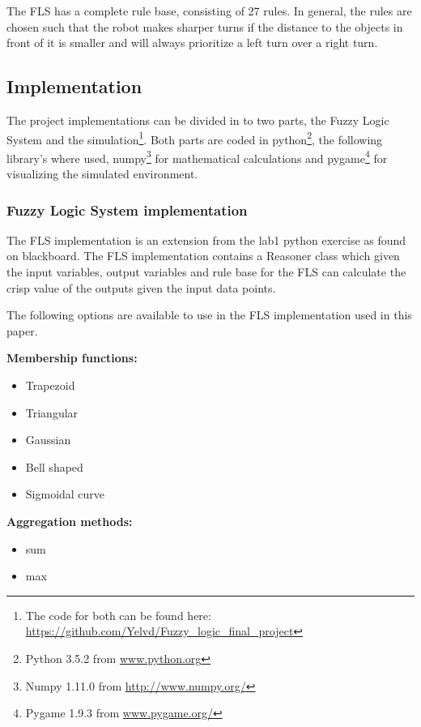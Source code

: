 \documentclass[conference]{IEEEtran}
\begin{document}
The FLS has a complete rule base, consisting of 27 rules.
In general, the rules are chosen such that the robot makes sharper turns if the distance to the objects in front of it is smaller and will always prioritize a left turn over a right turn.

\subsection{Implementation}
The project implementations can be divided in to two parts, the Fuzzy Logic System and the simulation\footnote{The code for both can be found here: \url{https://github.com/Yelvd/Fuzzy_logic_final_project}}. Both parts are coded in python\footnote{Python 3.5.2 from \url{www.python.org}}, the following library's where used, numpy\footnote{Numpy 1.11.0 from \url{http://www.numpy.org/}} for mathematical calculations and pygame\footnote{Pygame 1.9.3 from \url{www.pygame.org/}} for visualizing the simulated environment.

\subsubsection*{Fuzzy Logic System implementation}

The FLS implementation is an extension from the lab1 python exercise as found on blackboard. The FLS implementation contains a Reasoner class which given the input variables, output variables and rule base for the FLS can calculate the crisp value of the outputs given the input data points.

The following options are available to use in the FLS implementation used in this paper.

\textbf{Membership functions:}
\begin{itemize}
  \item Trapezoid
  \item Triangular
  \item Gaussian
  \item Bell shaped
  \item Sigmoidal curve
\end{itemize}

\textbf{Aggregation methods:}
\begin{itemize}
  \item sum
  \item max
\end{itemize}
\end{document}
